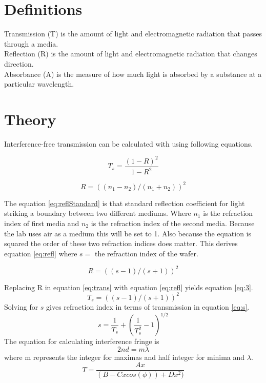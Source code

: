 \documentclass[10pt,a4paper]{article}
\begin{document}
\begin{multicols}{2}
\section*{Definitions}
Transmission (T) is the amount of light and electromagnetic radiation that passes through a media.\\
Reflection (R) is the amount of light and electromagnetic radiation that changes direction. \\
Absorbance (A) is the measure of how much light is absorbed by a substance at a particular wavelength.\\


\section*{Theory}

Interference-free transmission can be calculated with using following equations.

\begin{equation}
\label{eq:trans}
T_s = \dfrac{(1-R)^2}{1-R^2}
\end{equation}

\begin{equation}
\label{eq:reflStandard}
R = ((n_1-n_2)/(n_1+n_2))^2
\end{equation}

The equation \ref{eq:reflStandard} is that standard reflection coefficient for light striking a boundary between two different mediums. Where $n_1$ is the refraction index of first media and $n_2$ is the refraction index of the second media. Because the lab uses air as a medium this will be set to 1. Also because the equation is squared the order of these two refraction indices does matter. This derives equation \ref{eq:refl} where $s =$ the refraction index of the wafer.

\begin{equation}
\label{eq:refl}
R = ((s-1)/(s+1))^2
\end{equation}

Replacing R in equation \ref{eq:trans} with equation \ref{eq:refl} yields equation \ref{eq:3}.
\begin{equation}
\label{eq:3}
T_s = ((s-1)/(s+1))^2
\end{equation}
Solving for $s$ gives refraction index in terms of transmission in equation \ref{eq:s}.
\begin{equation}
\label{eq:s}
s = \frac{1}{T_s} + (\frac{1}{T_s^2}  - 1)^{1/2}
\end{equation}
The equation for calculating interference fringe is
\begin{equation}\label{eq:interfringe}
2nd = m \lambda
\end{equation}
where m represents the integer for maximas and half integer for minima and $\lambda$.
\begin{equation}
\label{eq:TransReg}
T = \dfrac{Ax}{(B-Cx cos(\phi) )+Dx^2)}
\end{equation}


\end{multicols}
\end{document}
